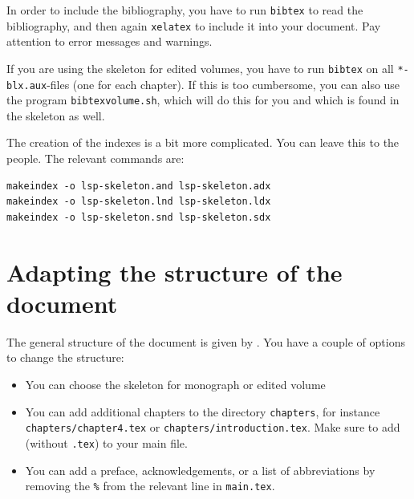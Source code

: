 In order to include the bibliography, you have to run \verb+bibtex+ to read the bibliography, and then again \verb+xelatex+ to include it into your document. Pay attention to error messages and warnings.
 
If you are using the skeleton for edited volumes, you have to run  \verb+bibtex+ on all \verb+*-blx.aux+-files (one for each chapter). If this is too cumbersome, you can also use the program \verb+bibtexvolume.sh+, which will do this for you and which is found in the skeleton as well. 

The creation of the indexes is a bit more complicated. You can leave this to the \lsp people. The relevant commands are:

\begin{verbatim}
makeindex -o lsp-skeleton.and lsp-skeleton.adx
makeindex -o lsp-skeleton.lnd lsp-skeleton.ldx 
makeindex -o lsp-skeleton.snd lsp-skeleton.sdx
\end{verbatim} 


\section{Adapting the structure of the document}
The general structure of the document is given by \lsp. You have a couple of options to change the structure:
\begin{itemize}
 \item You can choose the skeleton for monograph or edited volume
 \item You can add additional chapters to the directory \verb+chapters+, for instance\\ \verb+chapters/chapter4.tex+ or \verb+chapters/introduction.tex+. Make sure to add \verb++ (without \verb+.tex+) to your main file.
 \item You can add a preface, acknowledgements, or a list of abbreviations by removing the \verb+%+ from the relevant line in \verb+main.tex+.
 \end{itemize}



